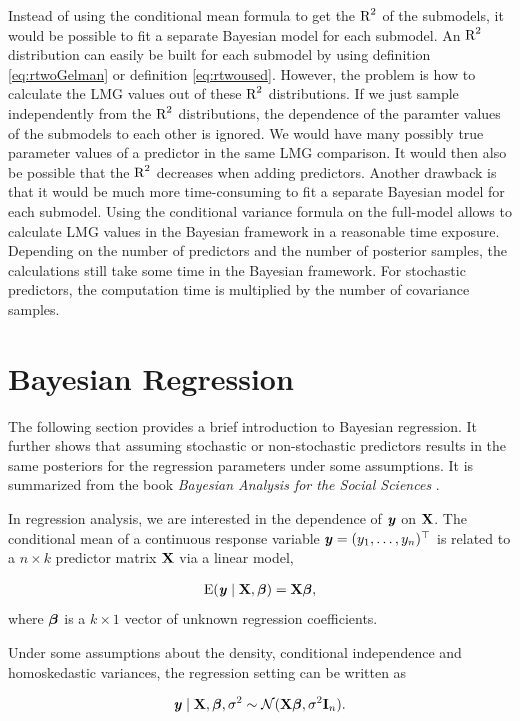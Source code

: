 \documentclass[11pt,a4paper,twoside]{book}\usepackage[]{graphicx}\usepackage[]{color}
\begin{document}
Instead of using the conditional mean formula to get the $\text{R}^2$ of the submodels,  it would be possible to fit a separate Bayesian model for each submodel. An $\text{R}^2$ distribution can easily be built for each submodel by using definition \eqref{eq:rtwoGelman} or definition \eqref{eq:rtwoused}. However, the problem is how to calculate the LMG values out of these $\text{R}^2$ distributions. If we just sample independently from the $\text{R}^2$ distributions, the dependence of the paramter values of the submodels to each other is ignored. We would have many possibly true parameter values of a predictor in the same LMG comparison. It would then also be possible that the $\text{R}^2$ decreases when adding predictors.  Another drawback is that it would be much more time-consuming to fit a separate Bayesian model for each submodel. Using the conditional variance formula on the full-model allows to calculate LMG values in the Bayesian framework in a reasonable time exposure. Depending on the number of predictors and the number of posterior samples, the calculations still take some time in the Bayesian framework. For stochastic predictors, the computation time is multiplied by the number of covariance samples.


\section{Bayesian Regression}
The following section provides a brief introduction to Bayesian regression. It further shows that assuming stochastic or non-stochastic predictors results in the same posteriors for the regression parameters under some assumptions.  It is summarized from the book \textit{Bayesian Analysis for the Social Sciences} \citep{Jackman2009}. 

In regression analysis, we are interested in the dependence of ${\textbf{\textit{y}}}$ on ${\mathbf{X}}$. The conditional mean of a continuous response variable ${\textbf{\textit{y}}} = (y_{1}, \dots, y_{n})^\top$ is related to a $n \times k$ predictor matrix ${\mathbf{X}}$ via a linear model, 

       \begin{align*} 
\operatorname{E}({\textbf{\textit{y}}} \mid {\mathbf{X}} , {\boldsymbol{\beta}}) = {\mathbf{X}} {\boldsymbol{\beta}} ,
   \end{align*}
where ${\boldsymbol{\beta}}$ is a $k \times 1$ vector of unknown regression coefficients.

Under some assumptions about the density, conditional independence and homoskedastic variances, the regression setting can be written as

       \begin{align*} 
{\textbf{\textit{y}}} \mid {\mathbf{X}} , {\boldsymbol{\beta}}, \sigma^2 \sim \mathcal{N}({\mathbf{X}} {\boldsymbol{\beta}} , \sigma^2 {\mathbf{I}}_{n}) \text{.}
   \end{align*}
\end{document}
